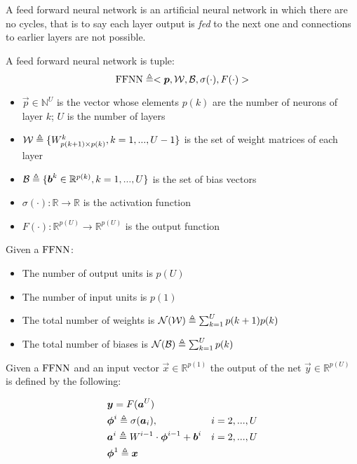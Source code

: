 
A feed forward neural network is an artificial neural network in which there are no cycles, that is to say each layer output is \textit{fed} to the 
next one and connections to earlier layers are not possible. 


\begin{defn}
\label{def_ffnn}
A feed forward neural network is tuple:
$$\mathrm{FFNN}\triangleq<\boldsymbol{p},\mathcal{W},\mathcal{B},\sigma(\cdot),F(\cdot)>$$
\begin{itemize}
 \item $\vec{p} \in \mathbb{N}^U$ is the vector whose elements $p(k)$ are the number of neurons of layer $k$; $U$ is the number of layers
 \item $\mathcal{W} \triangleq \{W^k_{p(k+1) \times p(k)}, k=1,...,U-1 \}$ is the set of weight matrices of each layer
 \item $\mathcal{B} \triangleq \{\boldsymbol{b}^k \in \mathbb{R}^{p(k)}, k=1,...,U \} $ is the set of bias vectors
 \item $\sigma(\cdot): \mathbb{R}\rightarrow \mathbb{R}$ is the activation function
 \item $F(\cdot): \mathbb{R}^{p(U)}\rightarrow \mathbb{R}^{p(U)}$ is the output function
\end{itemize}
\end{defn}

\begin{remark}{}
Given a $\mathrm{FFNN}$:
\begin{itemize}
 \item The number of output units is $p(U)$
 \item The number of input units is $p(1)$
 \item The total number of weights is $\mathcal{N}(\mathcal{W}) \triangleq \sum_{k=1}^U p(k+1)p(k)$
 \item The total number of biases is $\mathcal{N}(\mathcal{B}) \triangleq \sum_{k=1}^{U} p(k)$
\end{itemize}
\end{remark}

\begin{defn}
Given a $\mathrm{FFNN}$ and an input vector $\vec{x} \in \mathbb{R}^{p(1)}$ the output of the net $\vec{y} \in \mathbb{R}^{p(U)}$  is defined by the following:

\begin{align}
&\boldsymbol{y}=F(\boldsymbol{a}^{U}) &\\
&\boldsymbol{\phi}^{i} \triangleq \sigma(\boldsymbol{a}_{i}), & i=2,...,U\\
&\boldsymbol{a}^{i} \triangleq W^{i-1} \cdot \boldsymbol{\phi}^{i-1} +\boldsymbol{b}^i  & i=2,...,U\\
&\boldsymbol{\phi}^{1} \triangleq \boldsymbol{x} &
\end{align}
\end{defn}

